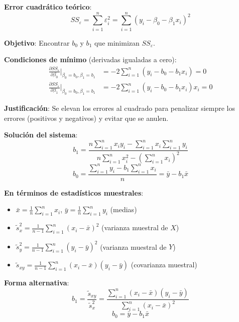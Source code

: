 \documentclass[10pt,a4paper]{article}
\begin{document}
\begin{tcolorbox}[title=Método de Mínimos Cuadrados]
    \textbf{Error cuadrático teórico}:
    \[
        SS_\varepsilon = \sum_{i=1}^n \varepsilon_i^2 = \sum_{i=1}^n (y_i - \beta_0 - \beta_1 x_i)^2
    \]
    
    \textbf{Objetivo}: Encontrar $b_0$ y $b_1$ que minimizan $SS_\varepsilon$.
    
    \textbf{Condiciones de mínimo} (derivadas igualadas a cero):
    \begin{align*}
        \frac{\partial SS_\varepsilon}{\partial \beta_0}\Big|_{\beta_0=b_0, \beta_1=b_1} &= -2\sum_{i=1}^n (y_i - b_0 - b_1 x_i) = 0 \\
        \frac{\partial SS_\varepsilon}{\partial \beta_1}\Big|_{\beta_0=b_0, \beta_1=b_1} &= -2\sum_{i=1}^n (y_i - b_0 - b_1 x_i)x_i = 0
    \end{align*}
    
    \textbf{Justificación}: Se elevan los errores al cuadrado para penalizar siempre los errores (positivos y negativos) y evitar que se anulen.
\end{tcolorbox}

\begin{tcolorbox}[title=Estimadores de Mínimos Cuadrados]
    \textbf{Solución del sistema}:
    \[
        b_1 = \frac{n\sum_{i=1}^n x_i y_i - \sum_{i=1}^n x_i \sum_{i=1}^n y_i}{n\sum_{i=1}^n x_i^2 - \left(\sum_{i=1}^n x_i\right)^2}
    \]
    \[
        b_0 = \frac{\sum_{i=1}^n y_i - b_1 \sum_{i=1}^n x_i}{n} = \bar{y} - b_1 \bar{x}
    \]
    
    \textbf{En términos de estadísticos muestrales}:
    \begin{itemize}
        \item $\bar{x} = \frac{1}{n}\sum_{i=1}^n x_i$, $\bar{y} = \frac{1}{n}\sum_{i=1}^n y_i$ (medias)
        \item $\tilde{s}_x^2 = \frac{1}{n-1}\sum_{i=1}^n (x_i - \bar{x})^2$ (varianza muestral de $X$)
        \item $\tilde{s}_y^2 = \frac{1}{n-1}\sum_{i=1}^n (y_i - \bar{y})^2$ (varianza muestral de $Y$)
        \item $\tilde{s}_{xy} = \frac{1}{n-1}\sum_{i=1}^n (x_i - \bar{x})(y_i - \bar{y})$ (covarianza muestral)
    \end{itemize}
    
    \textbf{Forma alternativa}:
    \[
        b_1 = \frac{\tilde{s}_{xy}}{\tilde{s}_x^2} = \frac{\sum_{i=1}^n (x_i - \bar{x})(y_i - \bar{y})}{\sum_{i=1}^n (x_i - \bar{x})^2}
    \]
    \[
        b_0 = \bar{y} - b_1 \bar{x}
    \]
\end{tcolorbox}
\end{document}
